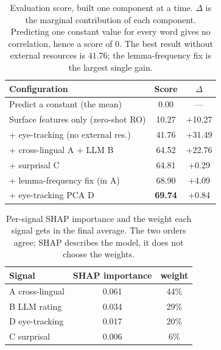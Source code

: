\documentclass[11pt]{article}
\begin{document}
\begin{table}[tbp]
\centering\small
\begin{tabular}{lcc}
\toprule
\textbf{Configuration} & \textbf{Score} & \textbf{$\Delta$} \\
\midrule
Predict a constant (the mean) & 0.00 & --- \\
Surface features only (zero-shot RO) & 10.27 & +10.27 \\
\;+ eye-tracking (no external res.) & 41.76 & +31.49 \\
\;+ cross-lingual A + LLM B & 64.52 & +22.76 \\
\;+ surprisal C & 64.81 & +0.29 \\
\;+ lemma-frequency fix (in A) & 68.90 & +4.09 \\
\;+ eye-tracking PCA D & \textbf{69.74} & +0.84 \\
\bottomrule
\end{tabular}
\caption{Evaluation score, built one component at a time. $\Delta$ is the marginal contribution of each component.
Predicting one constant value for every word gives no correlation, hence a score of $0$. The best result without
external resources is $41.76$; the lemma-frequency fix is the largest single gain.}
\label{tab:ablation}
\end{table}

\begin{table}[tbp]
\centering\small
\begin{tabular}{lcc}
\toprule
\textbf{Signal} & \textbf{SHAP importance} & \textbf{weight} \\
\midrule
A cross-lingual & 0.061 & 44\% \\
B LLM rating & 0.034 & 29\% \\
D eye-tracking & 0.017 & 20\% \\
C surprisal & 0.006 & 6\% \\
\bottomrule
\end{tabular}
\caption{Per-signal SHAP importance and the weight each signal gets in the final average. The two orders agree;
SHAP describes the model, it does not choose the weights.}
\label{tab:signals}
\end{table}
\end{document}
